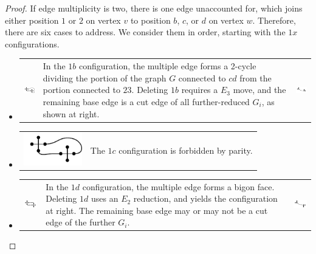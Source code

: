 \documentclass[amsmath,secnumarabic,floatfix,amssymb,nofootinbib,nobibnotes,letterpaper,11pt,tightenlines,showkeys]{revtex4}
\theoremstyle{definition}
\newcommand{\edgedouble}{E_2}
\newcommand{\cutedgedouble}{E_3}
\begin{document}
\begin{proof}
If edge multiplicity is two, there is one edge unaccounted for, which joins either position $1$ or $2$ on vertex $v$ to position $b$, $c$, or $d$ on vertex $w$. Therefore, there are six cases to address. We consider them in order, starting with the $1x$ configurations.
\begin{itemize}
\item 
\begin{tabular}{m{1in}m{3in}m{1in}}
\includegraphics[width=0.9in]{1-b-configuration}
&
In the $1b$ configuration, the multiple edge forms a 2-cycle dividing the portion of the graph $G$ connected to $cd$ from the portion connected to $23$. Deleting $1b$ requires a $\cutedgedouble$ move, and the remaining base edge is a cut edge of all further-reduced $G_i$, as shown at right.
&
\includegraphics[width=0.9in]{1-b-target}
\end{tabular}
\item 
\begin{tabular}{m{1in}m{3in}}
\includegraphics[width=1in]{1-c-configuration}
&
The $1c$ configuration is forbidden by parity. 
\end{tabular}
\item 
\begin{tabular}{m{1in}m{3in}m{1in}}
\includegraphics[width=0.9in]{1-d-configuration}
&
In the $1d$ configuration, the multiple edge forms a bigon face. Deleting $1d$ uses an $\edgedouble$ reduction, and yields the configuration at right. The remaining base edge may or may not be a cut edge of the further $G_i$.
&
\includegraphics[width=0.9in]{1-d-target}
\end{tabular}

\end{itemize}
\end{proof}
\end{document}
